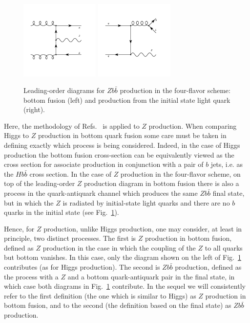 \documentclass[12pt]{article}
\begin{document}
\begin{figure}
  \begin{center}
    \includegraphics[width=0.35\textwidth]{ggZbb_t.pdf}
    \includegraphics[width=0.35\textwidth]{qq_gbb.pdf} 
    \caption{\label{fig:fusvsfs} Leading-order diagrams for $Zb\bar b$ 
 production in the four-flavor scheme: bottom fusion (left)
 and production from the initial state light quark (right).
    }
  \end{center}
\end{figure}
Here, the methodology of
Refs.~\cite{Forte:2015hba,Forte:2016sja} is applied to $Z$
production. When comparing Higgs to $Z$ production in bottom quark
fusion some care must be taken in defining exactly which process is
being considered. 
Indeed, in the case of Higgs production the bottom fusion
cross-section can be equivalently viewed as the cross section for
associate production in conjunction with a pair of $b$ jets, i.e. as the
$H b\bar b$ cross section. In the case of $Z$ production in the
four-flavor scheme, on top of the leading-order $Z$ production diagram
in bottom fusion  there is also a process in the quark-antiquark
channel which produces the same $Z b\bar b$ final state, but in which
the $Z$ is radiated by  initial-state  light quarks and there are no
$b$ quarks in the initial state (see Fig.~\ref{fig:fusvsfs}).

Hence, for $Z$ production, unlike Higgs production, one may consider,
at least in principle, two distinct processes. The first is $Z$ production
in bottom fusion, defined as $Z$ production in the case in
which the coupling of the $Z$ to all quarks but bottom vanishes. In
this case, only the diagram shown on the left of
Fig.~\ref{fig:fusvsfs} contributes (as for Higgs production). The
second is $Zb\bar b$ production, defined as the process with a $Z$ and a
bottom quark-antiquark pair in the final state, in which case both
diagrams in Fig.~\ref{fig:fusvsfs} contribute. In the sequel we will
consistently refer to the first definition (the one which is similar
to Higgs) as $Z$ production in bottom fusion, and to the second (the
definition based on the final state) as $Zb\bar b$ production.
\end{document}
